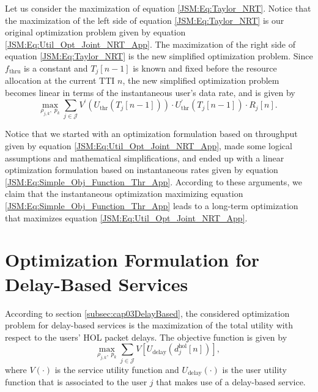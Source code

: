 \begin{apendicesenv}
Let us consider the maximization of equation \eqref{JSM:Eq:Taylor_NRT}. Notice that the maximization of the left side of equation \eqref{JSM:Eq:Taylor_NRT} is our original optimization problem given by equation \eqref{JSM:Eq:Util_Opt_Joint_NRT_App}. The maximization of the right side of equation \eqref{JSM:Eq:Taylor_NRT} is the new simplified optimization problem. Since $f_{\mathrm{thru}}$ is a constant and $T_j\left[n-1\right]$ is known and fixed before the resource allocation at the current \ac{TTI} $n$, the new simplified optimization problem becomes linear in terms of the instantaneous user's data rate, and is given by
%
\begin{equation}
\label{JSM:Eq:Simple_Obj_Function_Thr_App}
\underset{\rho_{j,k},\;p_{k}}{\text{max}} \; \sum_{j \in \mathcal{J}} V^{'}\left(U_{\mathrm{thr}}\left(T_{j}\left[n-1\right]\right)\right) \cdot U_{\mathrm{thr}}^{'}\left(T_{j}\left[n-1\right] \right) \cdot R_{j}\left[n\right].
\end{equation}

Notice that we started with an optimization formulation based on throughput given by equation \eqref{JSM:Eq:Util_Opt_Joint_NRT_App}, made some logical assumptions and mathematical simplifications, and ended up with a linear optimization formulation based on instantaneous rates given by equation \eqref{JSM:Eq:Simple_Obj_Function_Thr_App}. According to these arguments, we claim that the instantaneous optimization maximizing equation \eqref{JSM:Eq:Simple_Obj_Function_Thr_App} leads to a long-term optimization that maximizes equation \eqref{JSM:Eq:Util_Opt_Joint_NRT_App}.

\chapter{Optimization Formulation for Delay-Based Services}
\label{Ap:DelayBasedOpt}

According to section \ref{subsec:cap03DelayBased}, the considered optimization problem for delay-based services is the maximization of the total utility with respect to the users' \ac{HOL} packet delays. The objective function is given by
%
\begin{equation}
\label{JSM:Eq:Util_Opt_Joint_QUEUE_App}
\underset{\rho_{j,k},\;p_{k}}{\text{max}} \; \sum_{j \in \mathcal{J}} V\left[U_{\mathrm{delay}}\left(d_{j}^\mathrm{hol}\left[n\right]\right)\right],
\end{equation}
%
where $V\left(\cdot\right)$ is the service utility function and $U_{\mathrm{delay}}\left(\cdot\right)$ is the user utility function that is associated to the user $j$ that makes use of a delay-based service.


\end{apendicesenv}
